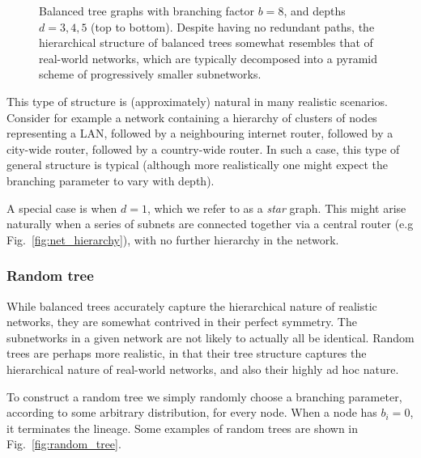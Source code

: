 \documentclass[aps,rmp,twocolumn,amsmath,amssymb,nofootinbib,superscriptaddress,longbibliography,floatfix,table-of-contents,eqsecnum]{revtex4-1}
\begin{document}
\begin{figure}[!htb]
\caption{Balanced tree graphs with branching factor $b=8$, and depths $d=3,4,5$ (top to bottom). Despite having no redundant paths, the hierarchical structure of balanced trees somewhat resembles that of real-world networks, which are typically decomposed into a pyramid scheme of progressively smaller subnetworks.} \label{fig:tree_example}
\end{figure}

This type of structure is (approximately) natural in many realistic scenarios. Consider for example a network containing a hierarchy of clusters of nodes representing a LAN, followed by a neighbouring internet router, followed by a city-wide router, followed by a country-wide router. In such a case, this type of general structure is typical (although more realistically one might expect the branching parameter to vary with depth).

A special case is when \mbox{$d=1$}, which we refer to as a \textit{star} graph. This might arise naturally when a series of subnets are connected together via a central router (e.g Fig.~\ref{fig:net_hierarchy}), with no further hierarchy in the network.

%
%

\subsubsection{Random tree} 

While balanced trees accurately capture the hierarchical nature of realistic networks, they are somewhat contrived in their perfect symmetry. The subnetworks in a given network are not likely to actually all be identical. Random trees are perhaps more realistic, in that their tree structure captures the hierarchical nature of real-world networks, and also their highly ad hoc nature.

To construct a random tree we simply randomly choose a branching parameter, according to some arbitrary distribution, for every node. When a node has \mbox{$b_i=0$}, it terminates the lineage. Some examples of random trees are shown in Fig.~\ref{fig:random_tree}.
\end{document}
